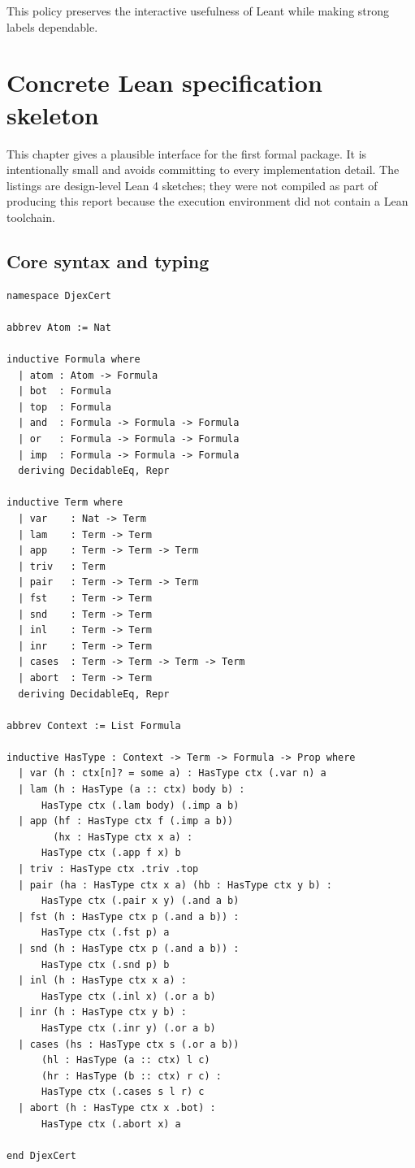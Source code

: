 \documentclass[11pt,letterpaper,openany]{report}
\theoremstyle{definition}
\theoremstyle{remark}
\begin{document}
This policy preserves the interactive usefulness of Leant while making strong labels dependable.

\chapter{Concrete Lean specification skeleton}
\label{ch:skeleton}

This chapter gives a plausible interface for the first formal package. It is intentionally small and avoids committing to every implementation detail. The listings are design-level Lean 4 sketches; they were not compiled as part of producing this report because the execution environment did not contain a Lean toolchain.

\section{Core syntax and typing}

\begin{lstlisting}[language=LeanFour,caption={Core definitions.}]
namespace DjexCert

abbrev Atom := Nat

inductive Formula where
  | atom : Atom -> Formula
  | bot  : Formula
  | top  : Formula
  | and  : Formula -> Formula -> Formula
  | or   : Formula -> Formula -> Formula
  | imp  : Formula -> Formula -> Formula
  deriving DecidableEq, Repr

inductive Term where
  | var    : Nat -> Term
  | lam    : Term -> Term
  | app    : Term -> Term -> Term
  | triv   : Term
  | pair   : Term -> Term -> Term
  | fst    : Term -> Term
  | snd    : Term -> Term
  | inl    : Term -> Term
  | inr    : Term -> Term
  | cases  : Term -> Term -> Term -> Term
  | abort  : Term -> Term
  deriving DecidableEq, Repr

abbrev Context := List Formula

inductive HasType : Context -> Term -> Formula -> Prop where
  | var (h : ctx[n]? = some a) : HasType ctx (.var n) a
  | lam (h : HasType (a :: ctx) body b) :
      HasType ctx (.lam body) (.imp a b)
  | app (hf : HasType ctx f (.imp a b))
        (hx : HasType ctx x a) :
      HasType ctx (.app f x) b
  | triv : HasType ctx .triv .top
  | pair (ha : HasType ctx x a) (hb : HasType ctx y b) :
      HasType ctx (.pair x y) (.and a b)
  | fst (h : HasType ctx p (.and a b)) :
      HasType ctx (.fst p) a
  | snd (h : HasType ctx p (.and a b)) :
      HasType ctx (.snd p) b
  | inl (h : HasType ctx x a) :
      HasType ctx (.inl x) (.or a b)
  | inr (h : HasType ctx y b) :
      HasType ctx (.inr y) (.or a b)
  | cases (hs : HasType ctx s (.or a b))
      (hl : HasType (a :: ctx) l c)
      (hr : HasType (b :: ctx) r c) :
      HasType ctx (.cases s l r) c
  | abort (h : HasType ctx x .bot) :
      HasType ctx (.abort x) a

end DjexCert
\end{lstlisting}
\end{document}
